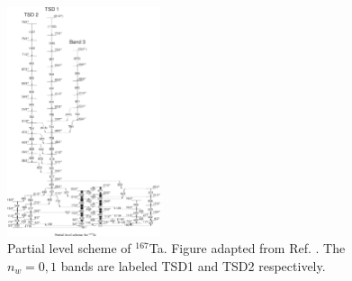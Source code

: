 \begin{figure}[t!]
\centerline{\includegraphics[width=0.4\textwidth]{./img/c4/167Ta_scheme.png}}
	\caption{Partial level scheme of $^{167}$Ta. Figure adapted from Ref. \cite{wobblingIn167Ta}. The $n_w=0,1$ bands are labeled TSD1 and TSD2 respectively.\label{fig:chp4-last-wobb}}
\end{figure}


